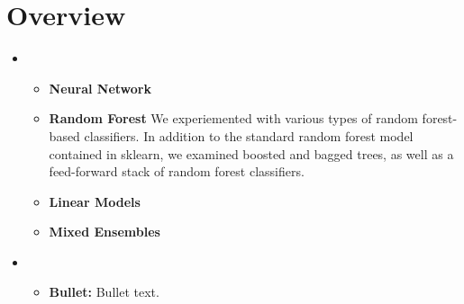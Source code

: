 \section{Overview}
\medskip
\begin{itemize}

    \item {}
    \begin{itemize}
    \item \textbf{Neural Network} 

    \item \textbf{Random Forest} We experiemented with various types of random forest-based classifiers. In addition to the standard random forest model contained in sklearn, we examined boosted and bagged trees, as well as a feed-forward stack of random forest classifiers.

    \item \textbf{Linear Models}

    \item \textbf{Mixed Ensembles}
    \end{itemize}

    \item {}
    \begin{itemize}
    \item \textbf{Bullet:} Bullet text.
    \end{itemize}

\end{itemize}



